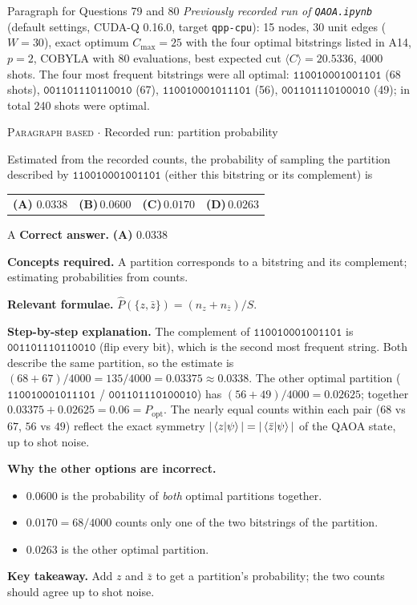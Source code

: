 \documentclass[11pt,a4paper]{article}
\newcommand{\optlabel}[1]{\textbf{(#1)}}
\newcommand{\correctlabel}[1]{\textcolor{okgreen}{\textbf{(#1)}\,\ding{51}}}
\newenvironment{qitem}[1]{\begin{list}{}{\setlength{\leftmargin}{3.3em}\setlength{\labelwidth}{3.1em}%
  \setlength{\labelsep}{0.2em}\setlength{\topsep}{3pt}\setlength{\parsep}{3pt}}\item[\textbf{Q.#1}\hfill]}{\end{list}}
\newcommand{\qsep}{\par\vspace{2pt}{\color{black!15}\hrule}\vspace{4pt}}
\newcommand{\qmeta}[2]{{\footnotesize\color{black!60}\textsc{#1} \;$\cdot$\; #2}\par}
\begin{document}
\begin{passagebox}{Paragraph for Questions 79 and 80}
\emph{Previously recorded run of \texttt{QAOA.ipynb}} (default settings, CUDA-Q 0.16.0, target \texttt{qpp-cpu}):
15 nodes, 30 unit edges ($W = 30$), exact optimum $C_{\max} = 25$ with the four optimal bitstrings listed in A14,
$p = 2$, COBYLA with 80 evaluations, best expected cut $\langle C\rangle = 20.5336$, $4000$ shots. The four most frequent
bitstrings were all optimal:
$\texttt{110010001001101}$ (68 shots), $\texttt{001101110110010}$ (67), $\texttt{110010001011101}$ (56), $\texttt{001101110100010}$ (49);
in total 240 shots were optimal.
\end{passagebox}
\begin{qitem}{79}
\qmeta{Paragraph based}{Recorded run: partition probability}
Estimated from the recorded counts, the probability of sampling the partition described by $\texttt{110010001001101}$
(either this bitstring or its complement) is
\par\smallskip\noindent\begin{tabularx}{\linewidth}{@{}*{4}{L}@{}}
\correctlabel{A}\,$0.0338$ & \optlabel{B}\,$0.0600$ & \optlabel{C}\,$0.0170$ & \optlabel{D}\,$0.0263$
\end{tabularx}
\end{qitem}
\begin{solbox}{A}
\textbf{\color{brand}Correct answer.} \textcolor{okgreen}{\textbf{(A)}} $0.0338$

\textbf{\color{brand}Concepts required.} A partition corresponds to a bitstring and its complement; estimating probabilities from counts.

\textbf{\color{brand}Relevant formulae.} $\hat P(\{z, \bar z\}) = (n_z + n_{\bar z})/S$.

\textbf{\color{brand}Step-by-step explanation.} The complement of $\texttt{110010001001101}$ is $\texttt{001101110110010}$ (flip every bit), which is the second most frequent
string. Both describe the same partition, so the estimate is $(68 + 67)/4000 = 135/4000 = 0.03375 \approx 0.0338$.
The other optimal partition ($\texttt{110010001011101}$ / $\texttt{001101110100010}$) has $(56 + 49)/4000 = 0.02625$; together
$0.03375 + 0.02625 = 0.06 = P_{\text{opt}}$. The nearly equal counts within each pair ($68$ vs $67$, $56$ vs $49$) reflect the exact
symmetry $|\braket{z|\psi}| = |\braket{\bar z|\psi}|$ of the QAOA state, up to shot noise.

\textbf{\color{brand}Why the other options are incorrect.}
\begin{itemize}[leftmargin=2.4em, itemsep=1pt, topsep=2pt]
\item[\textbf{(B)}] $0.0600$ is the probability of \emph{both} optimal partitions together.
\item[\textbf{(C)}] $0.0170 = 68/4000$ counts only one of the two bitstrings of the partition.
\item[\textbf{(D)}] $0.0263$ is the other optimal partition.
\end{itemize}
\textbf{\color{brand}Key takeaway.} Add $z$ and $\bar z$ to get a partition's probability; the two counts should agree up to shot noise.
\end{solbox}
\qsep
\end{document}
